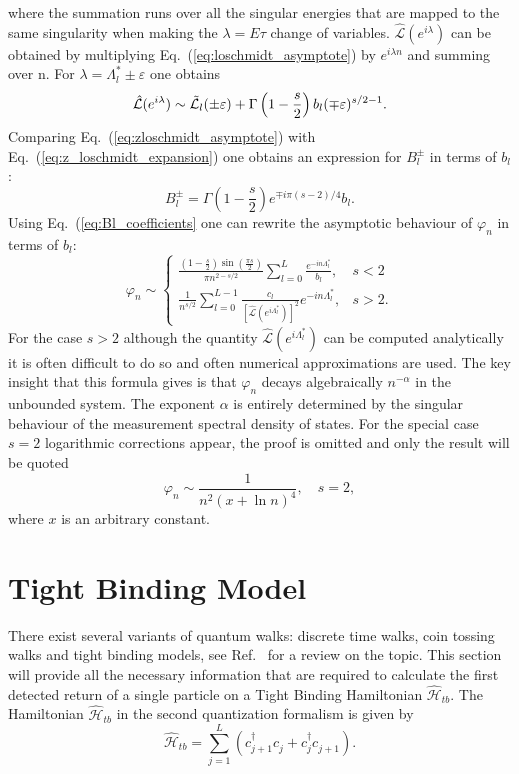 \documentclass[12pt]{article}
\numberwithin{equation}{section}
\renewcommand{\H}{\mathcal{\hat{H}}}
\newcommand{\1}{\mathbb{1}}
\newcommand{\annihilation}{c^{}}
\newcommand{\creation}{c^{\dagger}}
\newcommand{\tb}{\H_{tb}}
\newcommand{\Lvanhove}{\Lambda^*_l}
\begin{document}
where the summation runs over all the singular energies that are mapped to the same singularity when making the $\lambda=E\tau$ change of variables. $\hat{\mathcal{L}}(e^{i\lambda})$ can be obtained by multiplying Eq.~(\ref{eq:loschmidt_asymptote}) by $e^{i\lambda n}$ and summing over n. For $\lambda=\Lvanhove\pm\varepsilon$ one obtains
\begin{equation}
    \hat{\mathcal{L}}(e^{i\lambda})\sim \Tilde{\mathcal{L}}_l(\pm\varepsilon)+\Gamma\left(1-\frac{s}{2}\right)b_l (\mp\varepsilon)^{s/2-1}. \label{eq:zloschmidt_asymptote}
\end{equation}
Comparing Eq.~(\ref{eq:zloschmidt_asymptote}) with Eq.~(\ref{eq:z_loschmidt_expansion}) one obtains an expression for $B_l^{\pm}$ in terms of $b_l$:
\begin{equation}
    B_l^{\pm}=\Gamma\left(1-\frac{s}{2}\right)e^{\mp i\pi (s-2)/4}b_l. \label{eq:Bl_coefficients}
\end{equation}
Using Eq.~(\ref{eq:Bl_coefficients} one can rewrite the asymptotic behaviour of $\varphi_n$ in terms of $b_l$:
\begin{equation}
    \varphi_n \sim \begin{cases}
        \frac{\left(1-\frac{s}{2}\right)\sin\left(\frac{\pi s}{2}\right)}{\pi n^{2-s/2}}\sum_{l=0}^{L}\frac{e^{-in\Lvanhove}}{b_l},  & s<2
        \\
        \frac{1}{n^{s/2}}\sum_{l=0}^{L-1}\frac{c_l}{[\hat{\mathcal{L}}(e^{i\Lvanhove})]^2} e^{-in\Lvanhove}, &s>2.
    \end{cases}
\end{equation}
For the case $s>2$ although the quantity $\hat{\mathcal{L}}(e^{i\Lvanhove})$ can be computed analytically it is often difficult to do so and often numerical approximations are used. The key insight that this formula gives is that $\varphi_n$ decays algebraically $n^{-\alpha}$ in the unbounded system. The exponent $\alpha$ is entirely determined by the singular behaviour of the measurement spectral density of states. For the special case $s=2$ logarithmic corrections appear, the proof is omitted and only the result will be quoted
\begin{equation}
    \varphi_n\sim \frac{1}{n^2(x+\ln n)^4}, \quad s=2,
\end{equation}
where $x$ is an arbitrary constant. 


\section{Tight Binding Model}
There exist several variants of quantum walks: discrete time walks, coin tossing walks and tight binding models, see Ref.~\cite{konno_quantum_2002} for a review on the topic. This section will provide all the necessary information that are required to calculate the first detected return of a single particle on a Tight Binding Hamiltonian $\tb$.
The Hamiltonian $\tb$ in the second quantization formalism is given by
\begin{equation}\label{eq:tight_binding}
\tb=\sum_{j=1}^{L}(\creation_{j+1}\annihilation_j+\creation_{j}\annihilation_{j+1}).
\end{equation}
\end{document}
